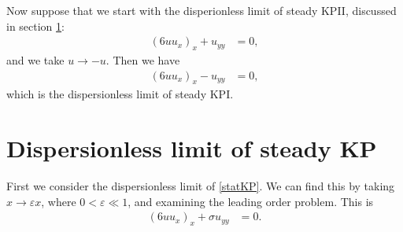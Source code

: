 \documentclass[12pt]{article}
\numberwithin{equation}{section}
\begin{document}
Now suppose that we start with the disperionless limit of steady KPII, discussed in section \ref{sec: disp limit}:
\begin{align}
    (6uu_x)_x + u_{yy} &= 0, 
    \label{statKPII}
\end{align}
and we take $u \to -u$. Then we have
\begin{align}
    (6uu_x)_x - u_{yy} &= 0, 
\end{align}
which is the dispersionless limit of steady KPI.

\section{Dispersionless limit of steady KP} \label{sec: disp limit}
First we consider the dispersionless limit of \eqref{statKP}. We can find this by taking $x \to \varepsilon x$, where $0 <\varepsilon \ll 1$, and examining the leading order problem. This is
\begin{align}
     (6uu_x)_x + \sigma u_{yy} &= 0. \label{KP2Dstatdisp}
\end{align}
\end{document}
